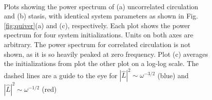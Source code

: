 \documentclass[11pt]{ucthesis}
\begin{document}
\begin{figure}
\centering
{}
\ \\
\caption{Plots showing the power spectrum of (a) uncorrelated circulation and (b) stasis, with identical system parameters as shown in Fig. \ref{fig:quiver}(a) and (c), respectively. Each plot shows the power spectrum for four system initializations. Units on both axes are arbitrary. The power spectrum for correlated circulation is not shown, as it is so heavily peaked at zero frequency. Plot (c) averages the initializations from plot the other plot on a log-log scale. The dashed lines are a guide to the eye for $|\hat{L}|^2\sim \omega^{-3/2}$ (blue) and $|\hat{L}|^2\sim \omega^{-1/2}$ (red) \label{fig:powerspectrum}}
\end{figure}
\end{document}
